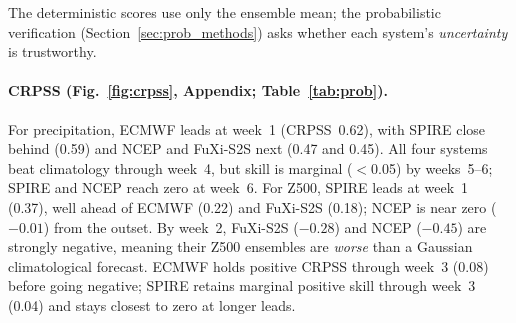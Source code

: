 \documentclass[11pt]{article}
\begin{document}
The deterministic scores use only the ensemble mean; the probabilistic
verification (Section~\ref{sec:prob_methods}) asks whether each system's
\emph{uncertainty} is trustworthy.

\paragraph{CRPSS (Fig.~\ref{fig:crpss}, Appendix; Table~\ref{tab:prob}).}
For precipitation, ECMWF leads at week~1 (CRPSS~0.62), with SPIRE
close behind (0.59) and NCEP and FuXi-S2S next (0.47 and 0.45). All
four systems beat climatology through week~4, but skill is marginal
($<$0.05) by weeks~5--6; SPIRE and NCEP reach zero at week~6.
For Z500, SPIRE leads at week~1 (0.37), well ahead of ECMWF (0.22)
and FuXi-S2S (0.18); NCEP is near zero ($-0.01$) from the outset.
By week~2, FuXi-S2S ($-0.28$) and NCEP ($-0.45$) are strongly
negative, meaning their Z500 ensembles are \emph{worse} than a
Gaussian climatological forecast. ECMWF holds positive CRPSS
through week~3 (0.08) before going negative; SPIRE retains marginal
positive skill through week~3 (0.04) and stays closest to zero
at longer leads.
\end{document}
